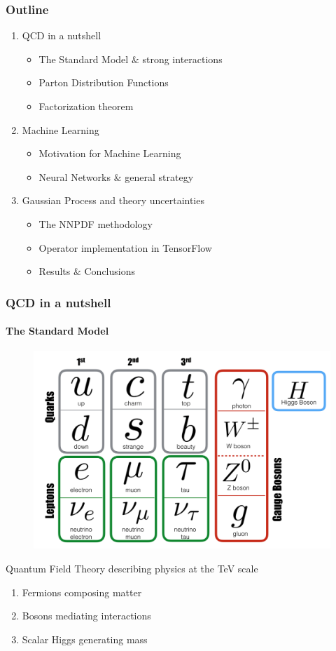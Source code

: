 \documentclass[aspectratio=43]{beamer}
\begin{document}
\begin{frame}

	\frametitle{Outline}
	
	\begin{enumerate}
		\item {\color{blue}QCD in a nutshell}
		\begin{itemize}
			\item The Standard Model $\&$ strong interactions
			\item Parton Distribution Functions
			\item Factorization theorem
		\end{itemize}
		\item {\color{blue}Machine Learning}
		\begin{itemize}
			\item Motivation for Machine Learning
			\item Neural Networks $\&$ general strategy
		\end{itemize}
		\item {\color{blue}Gaussian Process and theory uncertainties}
		\begin{itemize}
			\item The NNPDF methodology
			\item Operator implementation in TensorFlow
			\item Results $\&$ Conclusions
		\end{itemize}
	\end{enumerate}
	
\end{frame}

\begin{frame}
	

\end{frame}

\begin{frame}

	\frametitle{QCD in a nutshell}
	\framesubtitle{The Standard Model}

	\begin{figure}
		\includegraphics[width = 6 cm]{plots/SM.png}
	\end{figure}
 
	
	Quantum Field Theory describing physics at the TeV scale
	\begin{enumerate}
		\item Fermions composing matter
		\item Bosons mediating interactions
		\item Scalar Higgs generating mass
	\end{enumerate}	
	
\end{frame}
\end{document}
